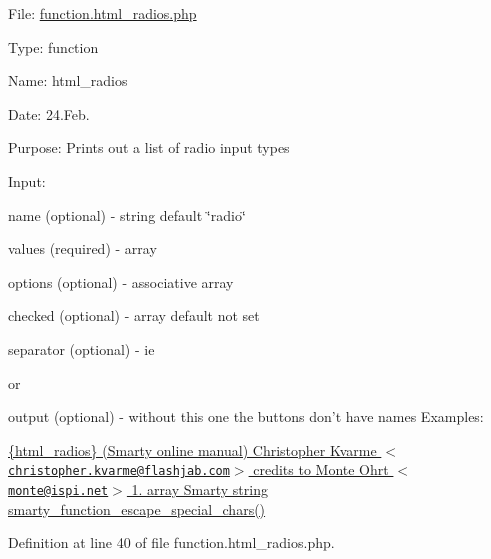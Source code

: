 \-File\-: \hyperlink{function_8html__radios_8php}{function.\-html\-\_\-radios.\-php}\par
 \-Type\-: function\par
 \-Name\-: html\-\_\-radios\par
 \-Date\-: 24.\-Feb.\par
 \-Purpose\-: \-Prints out a list of radio input types\par
 \-Input\-:\par

\begin{DoxyItemize}
\item name (optional) -\/ string default \char`\"{}radio\char`\"{}
\item values (required) -\/ array
\item options (optional) -\/ associative array
\item checked (optional) -\/ array default not set
\item separator (optional) -\/ ie \par
 or ~
\item output (optional) -\/ without this one the buttons don't have names \-Examples\-: 
 \hyperlink{}{\{html\-\_\-radios\} (\-Smarty online manual)  \-Christopher \-Kvarme $<$\href{mailto:christopher.kvarme@flashjab.com}{\tt christopher.\-kvarme@flashjab.\-com}$>$  credits to \-Monte \-Ohrt $<$\href{mailto:monte@ispi.net}{\tt monte@ispi.\-net}$>$  1.  array  \-Smarty  string  smarty\-\_\-function\-\_\-escape\-\_\-special\-\_\-chars() }
\end{DoxyItemize}

\-Definition at line 40 of file function.\-html\-\_\-radios.\-php.



